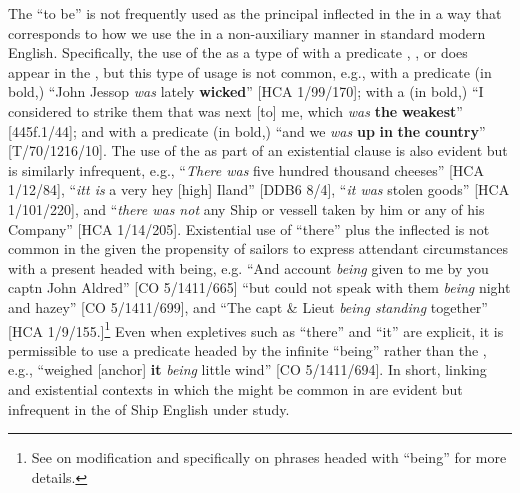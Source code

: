 The  “to be” is not frequently used as the principal inflected  in the  in a way that corresponds to how we use the  in a non-auxiliary manner in standard modern English. Specifically, the use of the  as a type of  with a predicate , , or  does appear in the , but this type of usage is not common, e.g., with a predicate  (in bold,) “John Jessop \textit{was} lately \textbf{wicked}” [HCA 1/99/170]; with a  (in bold,) “I considered to strike them that was next [to] me, which \textit{was} \textbf{the} \textbf{weakest}” [445f.1/44]; and with a predicate  (in bold,) “and we \textit{was} \textbf{up} \textbf{in} \textbf{the} \textbf{country}” [T/70/1216/10]. The use of the  as part of an existential clause is also evident but is similarly infrequent, e.g., “\textit{There was} five hundred thousand cheeses” [HCA 1/12/84], “\textit{itt is} a very hey [high] Iland” [DDB6 8/4], “\textit{it was} stolen goods” [HCA 1/101/220], and “\textit{there was not} any Ship or vessell taken by him or any of his Company” [HCA 1/14/205]. Existential use of “there” plus the inflected  is not common in the  given the propensity of sailors to express attendant circumstances with a present  headed with being, e.g. “And account \textit{being} given to me by you captn John Aldred” [CO 5/1411/665] “but could not speak with them \textit{being} night and hazey” [CO 5/1411/699], and “The capt \& Lieut \textit{being standing} together” [HCA 1/9/155.]\footnote{See  on  modification and specifically  on phrases headed with “being” for more details.} Even when expletives such as “there” and “it” are explicit, it is permissible to use a predicate headed by the infinite  “being” rather than the , e.g., “weighed [anchor] \textbf{it} \textit{being} little wind” [CO 5/1411/694]. In short, linking and existential contexts in which the  might be common in  are evident but infrequent in the  of Ship English under study. 

